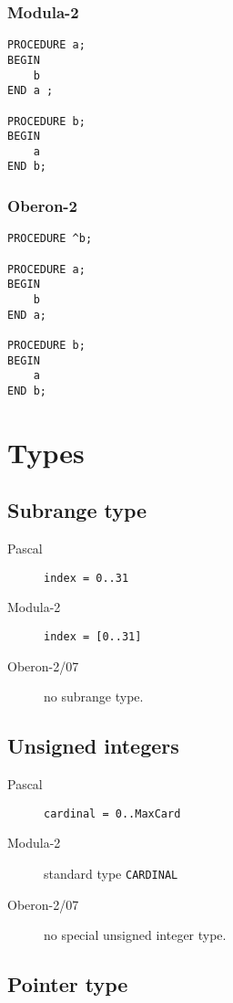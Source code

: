 \documentclass[10pt]{article}
\begin{document}
\subsubsection{Modula-2}
\begin{lstlisting}[style=example]   
PROCEDURE a; 
BEGIN
    b
END a ;
    
PROCEDURE b;
BEGIN 
    a
END b;
\end{lstlisting} 

\subsubsection{Oberon-2}
\begin{lstlisting}[style=example]   
PROCEDURE ^b;
    
PROCEDURE a; 
BEGIN
    b
END a; 
    
PROCEDURE b; 
BEGIN
    a
END b;    
\end{lstlisting}

\section{Types}

\subsection{Subrange type}

\begin{description}
    \item[Pascal] \lstinline!index = 0..31!
    \item[Modula-2] \lstinline!index = [0..31]!
    \item[Oberon-2/07] no subrange type.
\end{description}

\subsection{Unsigned integers}

\begin{description}
    \item[Pascal] \lstinline!cardinal = 0..MaxCard!
    \item[Modula-2] standard type \lstinline!CARDINAL!
    \item[Oberon-2/07] no special unsigned integer type.
\end{description}

\subsection{Pointer type}
\end{document}
